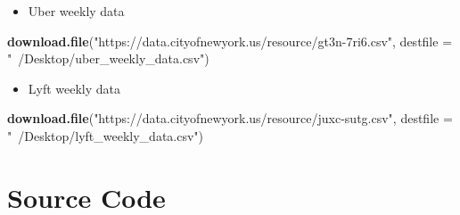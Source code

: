 \documentclass[12pt,twoside]{reedthesis}
\newenvironment{Shaded}{\begin{snugshade}}{\end{snugshade}}
\newcommand{\KeywordTok}[1]{\textcolor[rgb]{0.13,0.29,0.53}{\textbf{#1}}}
\newcommand{\DataTypeTok}[1]{\textcolor[rgb]{0.13,0.29,0.53}{#1}}
\newcommand{\StringTok}[1]{\textcolor[rgb]{0.31,0.60,0.02}{#1}}
\newcommand{\NormalTok}[1]{#1}
\providecommand{\tightlist}{%
  \setlength{\itemsep}{0pt}\setlength{\parskip}{0pt}}
\theoremstyle{definition}
\theoremstyle{definition}
\theoremstyle{definition}
\theoremstyle{remark}
\begin{document}
\begin{itemize}
\tightlist
\item
  Uber weekly data
\end{itemize}
\begin{Shaded}
\begin{Highlighting}[]
\KeywordTok{download.file}\NormalTok{(}\StringTok{"https://data.cityofnewyork.us/resource/gt3n-7ri6.csv"}\NormalTok{, }
    \DataTypeTok{destfile =} \StringTok{"~/Desktop/uber_weekly_data.csv"}\NormalTok{)}
\end{Highlighting}
\end{Shaded}
\begin{itemize}
\tightlist
\item
  Lyft weekly data
\end{itemize}
\begin{Shaded}
\begin{Highlighting}[]
\KeywordTok{download.file}\NormalTok{(}\StringTok{"https://data.cityofnewyork.us/resource/juxc-sutg.csv"}\NormalTok{, }
    \DataTypeTok{destfile =} \StringTok{"~/Desktop/lyft_weekly_data.csv"}\NormalTok{)}
\end{Highlighting}
\end{Shaded}
\section{Source Code}\label{source-code}
\end{document}
